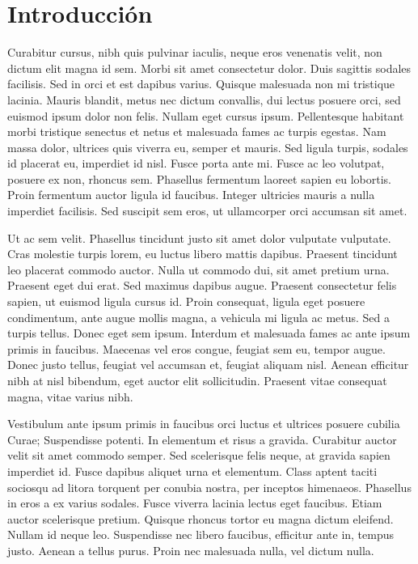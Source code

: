 \documentclass[10pt,twocolumn,a4paper]{article}
\begin{document}
\section{Introducción}

Curabitur cursus, nibh quis pulvinar iaculis, neque eros venenatis velit, non dictum elit magna id sem. Morbi sit amet consectetur dolor. Duis sagittis sodales facilisis. Sed in orci et est dapibus varius. Quisque malesuada non mi tristique lacinia. Mauris blandit, metus nec dictum convallis, dui lectus posuere orci, sed euismod ipsum dolor non felis. Nullam eget cursus ipsum. Pellentesque habitant morbi tristique senectus et netus et malesuada fames ac turpis egestas. Nam massa dolor, ultrices quis viverra eu, semper et mauris. Sed ligula turpis, sodales id placerat eu, imperdiet id nisl. Fusce porta ante mi. Fusce ac leo volutpat, posuere ex non, rhoncus sem. Phasellus fermentum laoreet sapien eu lobortis. Proin fermentum auctor ligula id faucibus. Integer ultricies mauris a nulla imperdiet facilisis. Sed suscipit sem eros, ut ullamcorper orci accumsan sit amet.

Ut ac sem velit. Phasellus tincidunt justo sit amet dolor vulputate vulputate. Cras molestie turpis lorem, eu luctus libero mattis dapibus. Praesent tincidunt leo placerat commodo auctor. Nulla ut commodo dui, sit amet pretium urna. Praesent eget dui erat. Sed maximus dapibus augue. Praesent consectetur felis sapien, ut euismod ligula cursus id. Proin consequat, ligula eget posuere condimentum, ante augue mollis magna, a vehicula mi ligula ac metus. Sed a turpis tellus. Donec eget sem ipsum. Interdum et malesuada fames ac ante ipsum primis in faucibus. Maecenas vel eros congue, feugiat sem eu, tempor augue. Donec justo tellus, feugiat vel accumsan et, feugiat aliquam nisl. Aenean efficitur nibh at nisl bibendum, eget auctor elit sollicitudin. Praesent vitae consequat magna, vitae varius nibh.

Vestibulum ante ipsum primis in faucibus orci luctus et ultrices posuere cubilia Curae; Suspendisse potenti. In elementum et risus a gravida. Curabitur auctor velit sit amet commodo semper. Sed scelerisque felis neque, at gravida sapien imperdiet id. Fusce dapibus aliquet urna et elementum. Class aptent taciti sociosqu ad litora torquent per conubia nostra, per inceptos himenaeos. Phasellus in eros a ex varius sodales. Fusce viverra lacinia lectus eget faucibus. Etiam auctor scelerisque pretium. Quisque rhoncus tortor eu magna dictum eleifend. Nullam id neque leo. Suspendisse nec libero faucibus, efficitur ante in, tempus justo. Aenean a tellus purus. Proin nec malesuada nulla, vel dictum nulla.
\end{document}
